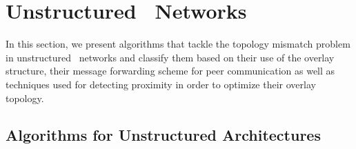 \section{Unstructured \p\ Networks}
\label{section:unstructured}

In this section, we present algorithms that tackle the topology mismatch
problem in unstructured \p\ networks and classify them based on their 
use of the overlay structure, their message forwarding scheme 
for peer communication as well as techniques used for detecting proximity 
in order to optimize their overlay topology.


%
%
%


\subsection{Algorithms for Unstructured Architectures}




